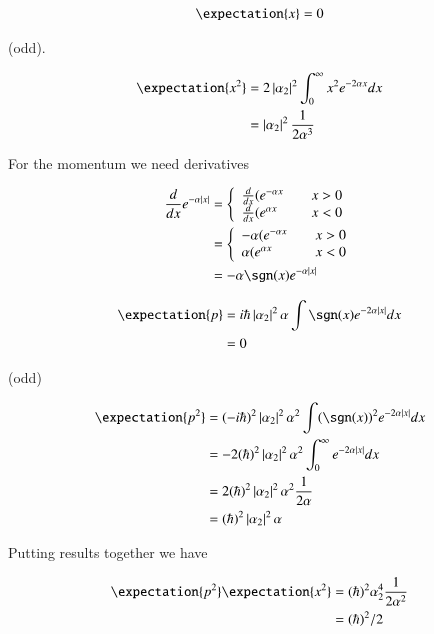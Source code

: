 \documentclass{article}
\begin{document}
\begin{align*}
\expectation{x} = 0
\end{align*}

(odd).

\begin{align*}
\expectation{x^2} 
&= 2 \Abs{\alpha_2}^2 \int_0^\infty x^2 e^{-2\alpha x} dx \\
&= \Abs{\alpha_2}^2 \inv{2 \alpha^3}
\end{align*}

For the momentum we need derivatives

\begin{align*}
\frac{d}{dx} e^{-\alpha \Abs{x}} 
&=
\left\{
\begin{array}{l l}
\frac{d}{dx}(e^{-\alpha x} & \quad \mbox{$x>0$} \\
\frac{d}{dx}(e^{\alpha x} & \quad \mbox{$x<0$} \\
\end{array}
\right. \\
&=
\left\{
\begin{array}{l l}
-\alpha (e^{-\alpha x} & \quad \mbox{$x>0$} \\
\alpha (e^{\alpha x} & \quad \mbox{$x<0$} \\
\end{array}
\right. \\
&=
-\alpha \sgn(x) e^{-\alpha \Abs{x}}
\end{align*}

\begin{align*}
\expectation{p} 
&= i \hbar \Abs{\alpha_2}^2 \alpha \int \sgn(x) e^{-2\alpha\Abs{x}} dx  \\
&= 0
\end{align*}

(odd)

\begin{align*}
\expectation{p^2} 
&= (-i \hbar)^2 \Abs{\alpha_2}^2 \alpha^2 \int (\sgn(x))^2 e^{-2\alpha\Abs{x}} dx  \\
&= - 2(\hbar)^2 \Abs{\alpha_2}^2 \alpha^2 \int_0^\infty e^{-2\alpha\Abs{x}} dx  \\
&= 2(\hbar)^2 \Abs{\alpha_2}^2 \alpha^2 \inv{2\alpha} \\
&= (\hbar)^2 \Abs{\alpha_2}^2 \alpha \\
\end{align*}

Putting results together we have

\begin{align*}
\expectation{p^2} \expectation{x^2} 
&= (\hbar)^2 \alpha_2^4 \inv{2 \alpha^2} \\
&= (\hbar)^2/2
\end{align*}
\end{document}
